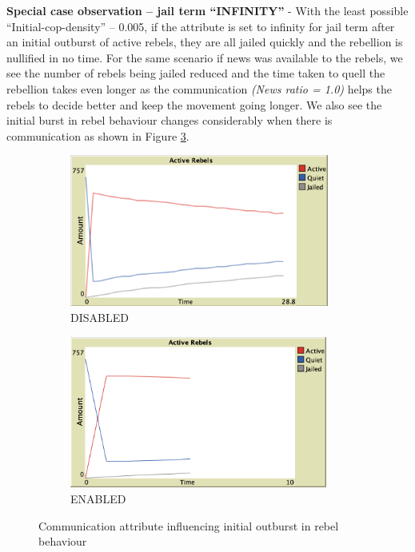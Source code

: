 \documentclass[a4paper,11pt]{article}
\begin{document}
\textbf{Special case observation – jail term “INFINITY”} - 
With the least possible “Initial-cop-density” – 0.005, if the attribute is set to infinity for jail term after an initial outburst of active rebels, they are all jailed quickly and the rebellion is nullified in no time. For the same scenario if news was available to the rebels, we see the number of rebels being jailed reduced and the time taken to quell the rebellion takes even longer as the communication \textit{(News ratio = 1.0)} helps the rebels to decide better and keep the movement going longer. We also see the initial burst in rebel behaviour changes considerably when there is communication as shown in Figure \ref{fig:fig3}.

\begin{figure}[h]

\begin{subfigure}{0.5\textwidth}
\includegraphics[width=0.9\linewidth, height=5cm]{BURST_COMM_OFF.png}
\caption{DISABLED}
\label{fig:subim1}
\end{subfigure}
\begin{subfigure}{0.5\textwidth}
\includegraphics[width=0.9\linewidth, height=5cm]{BURST_COMM_ON_copy.png}
\caption{ENABLED}
\label{fig:subim2}
\end{subfigure}

\caption{Communication attribute influencing initial outburst in rebel behaviour}
\label{fig:fig3}
\end{figure}
\end{document}
